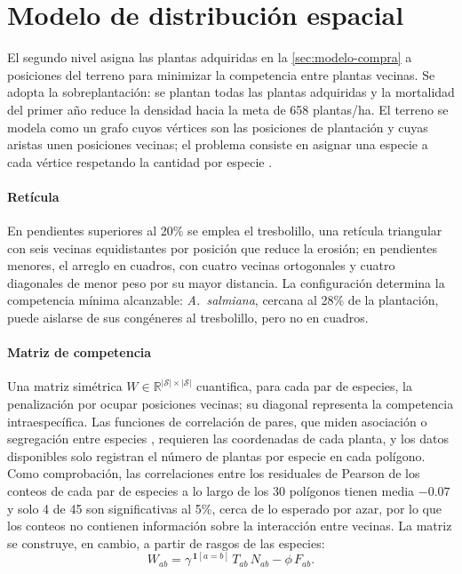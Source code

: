 \section{Modelo de distribución espacial}
\label{sec:modelo-espacial}

El segundo nivel asigna las plantas adquiridas en la \cref{sec:modelo-compra} a posiciones del terreno para minimizar la competencia entre plantas vecinas. Se adopta la sobreplantación: se plantan todas las plantas adquiridas y la mortalidad del primer año reduce la densidad hacia la meta de 658 plantas/ha. El terreno se modela como un grafo cuyos vértices son las posiciones de plantación y cuyas aristas unen posiciones vecinas; el problema consiste en asignar una especie a cada vértice respetando la cantidad por especie \autocite{elizalde2025,eisenblatter2002}.

\paragraph{Retícula} En pendientes superiores al 20\% se emplea el tresbolillo, una retícula triangular con seis vecinas equidistantes por posición que reduce la erosión; en pendientes menores, el arreglo en cuadros, con cuatro vecinas ortogonales y cuatro diagonales de menor peso por su mayor distancia. La configuración determina la competencia mínima alcanzable: \textit{A.~salmiana}, cercana al 28\% de la plantación, puede aislarse de sus congéneres al tresbolillo, pero no en cuadros.

\paragraph{Matriz de competencia} Una matriz simétrica $W\in\mathbb{R}^{|\mathcal{S}|\times|\mathcal{S}|}$ cuantifica, para cada par de especies, la penalización por ocupar posiciones vecinas; su diagonal representa la competencia intraespecífica. Las funciones de correlación de pares, que miden asociación o segregación entre especies \autocite{wiegand2014}, requieren las coordenadas de cada planta, y los datos disponibles solo registran el número de plantas por especie en cada polígono. Como comprobación, las correlaciones entre los residuales de Pearson de los conteos de cada par de especies a lo largo de los 30 polígonos tienen media $-0.07$ y solo 4 de 45 son significativas al 5\%, cerca de lo esperado por azar, por lo que los conteos no contienen información sobre la interacción entre vecinas. La matriz se construye, en cambio, a partir de rasgos de las especies:
\begin{equation}
W_{ab}=\gamma^{\,\mathbf{1}[a=b]}\,T_{ab}\,N_{ab}-\phi\,F_{ab}.
\label{eq:matriz-W}
\end{equation}

